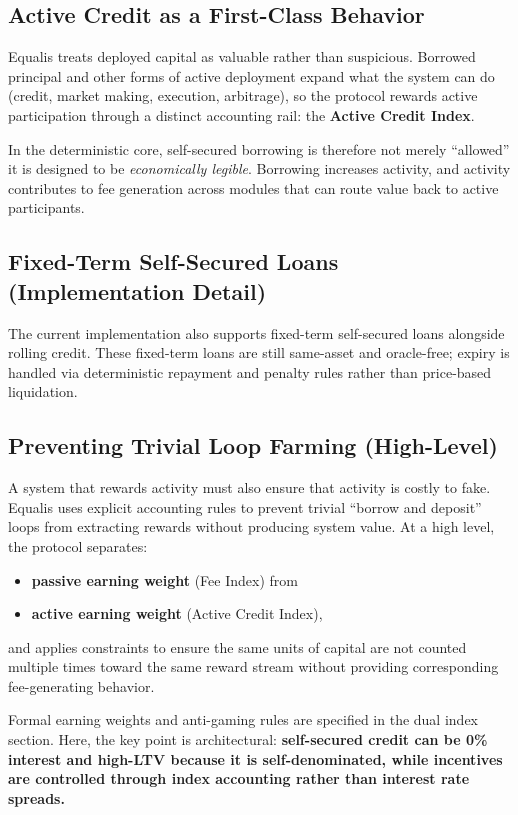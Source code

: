 \documentclass[version=preprint]{iacrcc}
\begin{document}
\subsection{Active Credit as a First-Class Behavior}

Equalis treats deployed capital as valuable rather than suspicious. Borrowed principal and other forms of active deployment expand what the system can do (credit, market making, execution, arbitrage), so the protocol rewards active participation through a distinct accounting rail: the \textbf{Active Credit Index}.

In the deterministic core, self-secured borrowing is therefore not merely ``allowed'' it is designed to be \textit{economically legible}. Borrowing increases activity, and activity contributes to fee generation across modules that can route value back to active participants.

\subsection{Fixed-Term Self-Secured Loans (Implementation Detail)}

The current implementation also supports fixed-term self-secured loans alongside rolling credit. These fixed-term loans are still same-asset and oracle-free; expiry is handled via deterministic repayment and penalty rules rather than price-based liquidation.

\subsection{Preventing Trivial Loop Farming (High-Level)}

A system that rewards activity must also ensure that activity is costly to fake. Equalis uses explicit accounting rules to prevent trivial ``borrow and deposit'' loops from extracting rewards without producing system value. At a high level, the protocol separates:
\begin{itemize}
  \item \textbf{passive earning weight} (Fee Index) from
  \item \textbf{active earning weight} (Active Credit Index),
\end{itemize}
and applies constraints to ensure the same units of capital are not counted multiple times toward the same reward stream without providing corresponding fee-generating behavior.

Formal earning weights and anti-gaming rules are specified in the dual index section. Here, the key point is architectural: \textbf{self-secured credit can be 0\% interest and high-LTV because it is self-denominated, while incentives are controlled through index accounting rather than interest rate spreads.}
\end{document}
